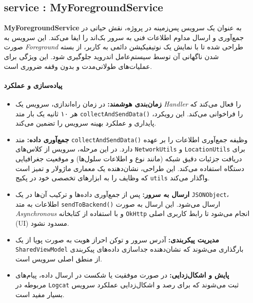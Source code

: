 \documentclass{report}
\begin{document}
\subsection{ service :  MyForegroundService}

\textbf{MyForegroundService} به عنوان یک سرویس پس‌زمینه در پروژه، نقش حیاتی در جمع‌آوری و ارسال مداوم اطلاعات فنی به سرور بک‌اند را ایفا می‌کند. این سرویس به صورت \textit{Foreground} طراحی شده تا با نمایش یک نوتیفیکیشن دائمی به کاربر، از بسته شدن ناگهانی آن توسط سیستم‌عامل اندروید جلوگیری شود. این ویژگی برای عملیات‌های طولانی‌مدت و بدون وقفه ضروری است.

\paragraph{پیاده‌سازی و عملکرد}

\begin{itemize}
\item\textbf{زمان‌بندی هوشمند:} در زمان راه‌اندازی، سرویس یک \textit{Handler} را فعال می‌کند که هر ۱۰ ثانیه یک بار متد \texttt{collectAndSendData()} را فراخوانی می‌کند. این رویکرد، پایداری و عملکرد بهینه سرویس را تضمین می‌کند.

\item\textbf{جمع‌آوری داده:} متد \texttt{collectAndSendData()} وظیفه جمع‌آوری اطلاعات را بر عهده دارد. در این مرحله، سرویس از کلاس‌های \texttt{NetworkUtils} و \texttt{LocationUtils} برای دریافت جزئیات دقیق شبکه (مانند نوع و اطلاعات سلول‌ها) و موقعیت جغرافیایی دستگاه استفاده می‌کند. این طراحی، نشان‌دهنده یک معماری ماژولار و تمیز است که وظایف را به ابزارهای تخصصی خود در پکیج \texttt{utils} واگذار می‌کند.

\item\textbf{ارسال به سرور:} پس از جمع‌آوری داده‌ها و ترکیب آن‌ها در یک \texttt{JSONObject}، اطلاعات به متد \texttt{sendToBackend()} ارسال می‌شود. این ارسال به صورت \textit{Asynchronous} و با استفاده از کتابخانه \texttt{OkHttp} انجام می‌شود تا رابط کاربری اصلی (UI) مسدود نشود.

\item\textbf{مدیریت پیکربندی:} آدرس سرور و توکن احراز هویت به صورت پویا از یک \texttt{SharedViewModel} بارگذاری می‌شوند که نشان‌دهنده جداسازی داده‌های پیکربندی از منطق اصلی سرویس است.

\item\textbf{پایش و اشکال‌زدایی:} در صورت موفقیت یا شکست در ارسال داده، پیام‌های مربوطه در \texttt{Logcat} ثبت می‌شوند که برای رصد و اشکال‌زدایی عملکرد سرویس بسیار مفید است.
\end{itemize}
\end{document}
